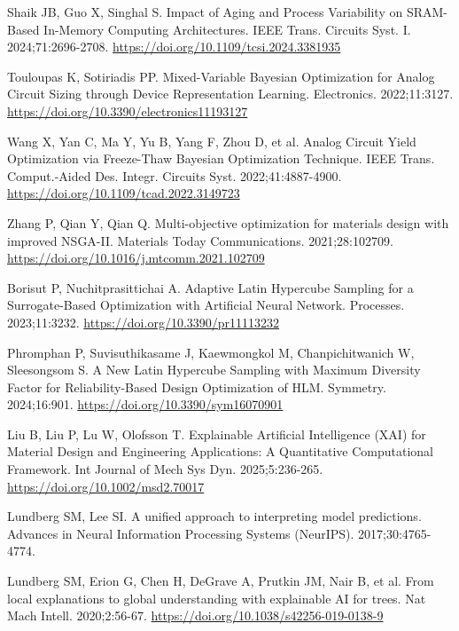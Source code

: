 Shaik JB, Guo X, Singhal S. Impact of Aging and Process Variability on SRAM-Based In-Memory Computing Architectures. IEEE Trans. Circuits Syst. I. 2024;71:2696-2708.
\href{https://doi.org/10.1109/tcsi.2024.3381935}{https://doi.org/10.1109/tcsi.2024.3381935}

Touloupas K, Sotiriadis PP. Mixed-Variable Bayesian Optimization for Analog Circuit Sizing through Device Representation Learning. Electronics. 2022;11:3127.
\href{https://doi.org/10.3390/electronics11193127}{https://doi.org/10.3390/electronics11193127}

Wang X, Yan C, Ma Y, Yu B, Yang F, Zhou D, et al. Analog Circuit Yield Optimization via Freeze-Thaw Bayesian Optimization Technique. IEEE Trans. Comput.-Aided Des. Integr. Circuits Syst. 2022;41:4887-4900.
\href{https://doi.org/10.1109/tcad.2022.3149723}{https://doi.org/10.1109/tcad.2022.3149723}

Zhang P, Qian Y, Qian Q. Multi-objective optimization for materials design with improved NSGA-II. Materials Today Communications. 2021;28:102709.
\href{https://doi.org/10.1016/j.mtcomm.2021.102709}{https://doi.org/10.1016/j.mtcomm.2021.102709}

Borisut P, Nuchitprasittichai A. Adaptive Latin Hypercube Sampling for a Surrogate-Based Optimization with Artificial Neural Network. Processes. 2023;11:3232.
\href{https://doi.org/10.3390/pr11113232}{https://doi.org/10.3390/pr11113232}

Phromphan P, Suvisuthikasame J, Kaewmongkol M, Chanpichitwanich W, Sleesongsom S. A New Latin Hypercube Sampling with Maximum Diversity Factor for Reliability-Based Design Optimization of HLM. Symmetry. 2024;16:901.
\href{https://doi.org/10.3390/sym16070901}{https://doi.org/10.3390/sym16070901}

Liu B, Liu P, Lu W, Olofsson T. Explainable Artificial Intelligence (XAI) for Material Design and Engineering Applications: A Quantitative Computational Framework. Int Journal of Mech Sys Dyn. 2025;5:236-265.
\href{https://doi.org/10.1002/msd2.70017}{https://doi.org/10.1002/msd2.70017}

Lundberg SM, Lee SI. A unified approach to interpreting model predictions. Advances in Neural Information Processing Systems (NeurIPS). 2017;30:4765-4774.

Lundberg SM, Erion G, Chen H, DeGrave A, Prutkin JM, Nair B, et al. From local explanations to global understanding with explainable AI for trees. Nat Mach Intell. 2020;2:56-67.
\href{https://doi.org/10.1038/s42256-019-0138-9}{https://doi.org/10.1038/s42256-019-0138-9}

